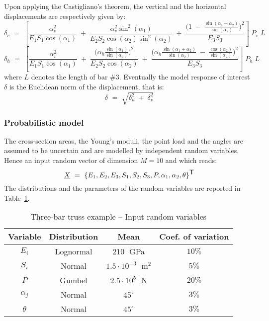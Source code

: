 \documentclass[11pt]{article}
\begin{document}
Upon applying the Castigliano's theorem, the vertical and the horizontal displacements are respectively given by:
\begin{equation}
  \delta_v \, \, = \, \,
  \left[ \frac{\alpha_v^2}{E_1 S_1 \cos(\alpha_1)} \; + \; \frac{\alpha_v^2 \sin^2(\alpha_1)}{E_2 S_2 \cos(\alpha_2) \sin^2(\alpha_2)} \; + \;
    \frac{\big( 1 \; - \; \frac{\sin(\alpha_1 + \alpha_2)}{\sin(\alpha_2)}\big)^2}{E_3 S_3}  \right]
  \; P_v \; L
\end{equation}
\begin{equation}
  \delta_h  \, \, = \, \,
  \left[
    \frac{\alpha_v^2}{E_1 S_1 \cos(\alpha_1)} \; + \;  \frac{\big(\alpha_h \frac{\sin(\alpha_1)}{\sin(\alpha_2)}  \big)^2}{E_2 S_2 \cos(\alpha_2)} \; + \;
    \frac{\big(\alpha_h \frac{\sin(\alpha_1 + \alpha_2)}{\sin(\alpha_2)} \; - \; \frac{\cos(\alpha_2)}{\sin(\alpha_2)} \big)^2}{E_3 S_3}
    \right]
  \; P_h \; L
\end{equation}
where $L$ denotes the length of bar \#3. Eventually the model response of interest $\delta$ is the Euclidean norm of the displacement, that is:
\begin{equation}
  \delta \, \, = \, \, \sqrt{\delta_h^2 \; + \; \delta_v^2}
\end{equation}

\subsubsection{Probabilistic model}

The cross-section areas, the Young's moduli, the point load and the angles are assumed to be uncertain and are modelled by independent random variables. Hence an input random vector of dimension $M=10$ and which reads:
\begin{equation}
  \underline{X} \, \, = \, \, \{E_1,E_2,E_3,S_1,S_2,S_3,P,\alpha_1,\alpha_2,\theta\}^{\mbox{\textsf{T}}}
\end{equation}
The distributions and the parameters of the random variables are reported in Table~\ref{table_rvs}.


\begin{table}[Hhbtp]
  \begin{center}
    \begin{tabular}{cccc}
      \hline
      Variable & Distribution & Mean & Coef. of variation \\
      \hline
      $E_i$ &  Lognormal & $210 \;$ GPa& $10\%$ \\
      $S_i$ & Normal & $1.5\cdot 10^{-3}\;$ m$^2$ & $5\%$ \\
      $P$ & Gumbel & $2.5\cdot10^{5}\;$ N& $20\%$ \\
      $\alpha_j$ & Normal & $45^\circ$& $3\%$\\
      $\theta$ & Normal & $45^\circ$& $3\%$   \\
      \hline
    \end{tabular}
    \caption{Three-bar truss example -- Input random variables}
    \label{table_rvs}
  \end{center}

\end{table}
\end{document}
